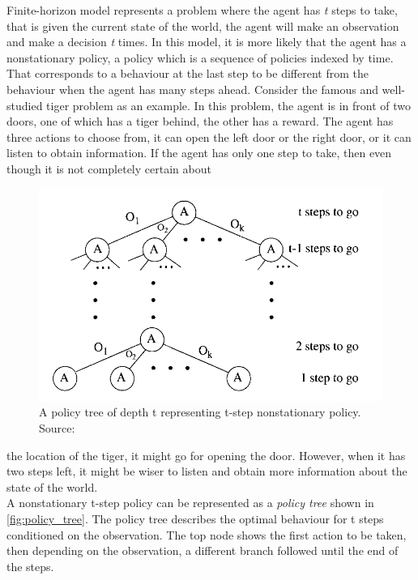 Finite-horizon model represents a problem where the agent has \textit{t} steps to take, that is given the current state of the world, the agent will make an observation and make a decision \textit{t} times. In this model, it is more likely that the agent has a nonstationary policy, a policy which is a sequence of policies indexed by time. That corresponds to a behaviour at the last step to be different from the behaviour when the agent has many steps ahead. Consider the famous and well-studied tiger problem as an example. In this problem, the agent is in front of two doors, one of which has a tiger behind, the other has a reward. The agent has three actions to choose from, it can open the left door or the right door, or it can listen to obtain information. If the agent has only one step to take, then even though it is not completely certain about
\begin{figure}
	\begin{center}
		\includegraphics[width=1\linewidth]{figures/policy_tree}
		\caption{A policy tree of depth t representing t-step nonstationary policy. Source: \cite{KAELBLING199899}}
		\label{fig:policy_tree}
	\end{center}
	\vspace{-55pt}
\end{figure} 
the location of the tiger, it might go for opening the door. However, when it has two steps left, it might be wiser to listen and obtain more information about the state of the world.\\
A nonstationary t-step policy can be represented as a \textit{policy tree} shown in \autoref{fig:policy_tree}. The policy tree describes the optimal behaviour for t steps conditioned on the observation. The top node shows the first action to be taken, then depending on the observation, a different branch followed until the end of the steps. \\

